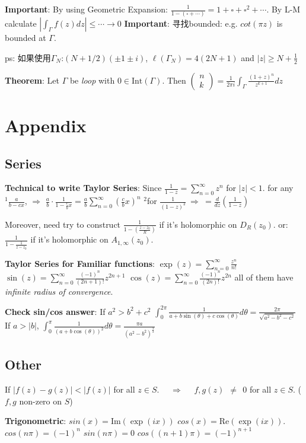 \documentclass[9pt]{article}
\begin{document}
{\scriptsize \textbf{Important}: By using Geometric Expansion: $\frac{1}{1-(\square+\cdots)}=1+\square+\square^2+\cdots$. By L-M calculate $|\int_{\Gamma}f(z)dz|\leq\cdots\to0$ \quad \textbf{Important}: 寻找bounded: e.g. $cot(\pi z)$ is bounded at $\Gamma$.}

\quad ps: 如果使用$\Gamma_N$:$(N+1/2)(\pm1\pm i)$, $\ell(\Gamma_N)=4(2N+1)$ and $|z|\geq N+\frac{1}{2}$

\textbf{Theorem}: Let $\Gamma$ be \textit{loop} with $0\in\text{Int}(\Gamma)$. Then $\begin{pmatrix}n \\ k\end{pmatrix}=\frac{1}{2\pi i}\int_\Gamma\frac{(1+z)^n}{z^{k+1}}dz$


\section{Appendix} %

\subsection{Series}

\textbf{Technical to write Taylor Series}: {\scriptsize Since $\frac{1}{1-z}=\sum_{n=0}^{\infty}z^n$ for $|z|<1$. \quad for any $^1\frac{a}{b-cx}$, $\Rightarrow$ $\frac{a}{b}\cdot\frac{1}{1-\frac{c}{b}x}=\frac{a}{b}\sum_{n=0}^{\infty}\left(\frac{c}{b}x\right)^n$ \quad $^2$for $\frac{1}{(1-z)^2} \ \Rightarrow \ =\frac{d}{dz}\left(\frac{1}{1-z}\right)$}

{\scriptsize \qquad Moreover, need try to construct $\frac{1}{1-(\frac{z-z_0}{R})}$ if it's holomorphic on $D_{R}(z_0)$. \qquad or: $\frac{1}{1-\frac{1}{z-z_0}}$ if it's holomorphic on $A_{1,\infty}(z_0)$.}

\textbf{Taylor Series for Familiar functions}: {\scriptsize $\exp(z)=\sum_{n=0}^{\infty}\frac{z^n}{n!}$ \quad $\sin(z)=\sum_{n=0}^{\infty}\frac{(-1)^n}{(2n+1)!}z^{2n+1}$ \quad $\cos(z)=\sum_{n=0}^{\infty}\frac{(-1)^n}{(2n)!}z^{2n}$ all of them have \textit{infinite radius of convergence}.}

\textbf{Check sin/cos answer}: If $a^2>b^2+c^2$ $\int_0^{2\pi}\frac{1}{a+b\sin(\theta)+c\cos(\theta)}d\theta=\frac{2\pi}{\sqrt{a^2-b^2-c^2}}$ \qquad If $a>|b|$, $\int^\pi_0\frac{1}{(a+b\cos(\theta))^2}d\theta=\frac{\pi a}{(a^2-b^2)^{\frac{3}{2}}}$


\subsection{Other}

If $|f(z)-g(z)|<|f(z)|$ for all $z\in S$. \ \ $\Rightarrow$ \ \ $f,g(z) \ \ \ne \ \ 0$ for all $z\in S$. ($f,g$ non-zero on $S$)

\textbf{Trigonometric}: {\small $sin(x)=\text{Im}(\exp({ix}))$ \quad $cos(x)=\text{Re}(\exp({ix}))$. \quad \quad $cos(n\pi)=(-1)^n$ \quad $sin(n\pi)=0$ \quad $cos((n+1)\pi)=(-1)^{n+1}$}
\end{document}
